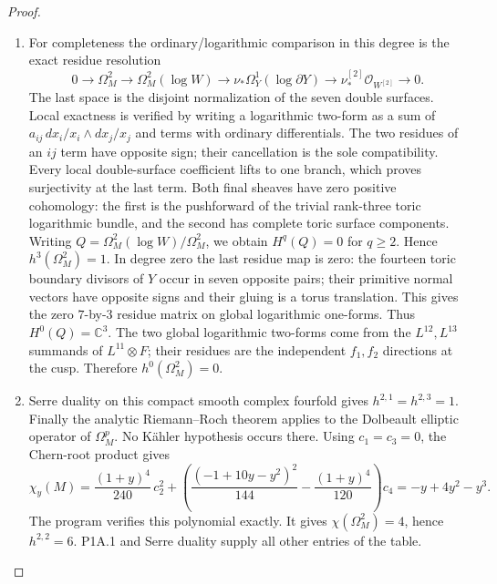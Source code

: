 \documentclass[11pt,a4paper]{article}
\theoremstyle{definition}
\begin{document}
\begin{proof}
\begin{enumerate}[label=\arabic*.]
\item For completeness the ordinary/logarithmic comparison in this
degree is the exact residue resolution
\[
0\to\Omega_M^2\to\Omega_M^2(\log W)
 \to\nu_*\Omega_Y^1(\log\partial Y)
 \to\nu^{[2]}_*\mathcal O_{W^{[2]}}\to0.
\]
The last space is the disjoint normalization of the seven
double surfaces. Local exactness is verified by writing a
logarithmic two-form as a sum of
$a_{ij}\,dx_i/x_i\wedge dx_j/x_j$ and terms with ordinary
differentials. The two residues of an $ij$ term have opposite
sign; their cancellation is the sole compatibility. Every local
double-surface coefficient lifts to one branch, which proves
surjectivity at the last term.
Both final sheaves have zero positive cohomology: the first
is the pushforward of the trivial rank-three toric logarithmic
bundle, and the second has complete toric surface components.
Writing $Q=\Omega_M^2(\log W)/\Omega_M^2$, we obtain
$H^q(Q)=0$ for $q\ge2$. Hence
$h^3(\Omega_M^2)=1$.
In degree zero the last residue map is zero: the fourteen toric
boundary divisors of $Y$ occur in seven opposite pairs; their
primitive normal vectors have opposite signs and their gluing
is a torus translation. This gives the zero $7$-by-$3$ residue
matrix on global logarithmic one-forms. Thus $H^0(Q)=\mathbb C^3$.
The two global logarithmic two-forms come from the
$L^{12},L^{13}$ summands of $L^{11}\otimes F$; their residues
are the independent $f_1,f_2$ directions at the cusp.
Therefore $h^0(\Omega_M^2)=0$.

\item Serre duality \cite[Theorem 4, p.~22]{Serre1955Duality} on this compact smooth complex fourfold gives
$h^{2,1}=h^{2,3}=1$. Finally the analytic Riemann--Roch theorem
\cite[Theorem 25.3.1, p.~187; \S25.4(a), pp.~188--190]{HirzebruchTopologicalMethods} applies to the Dolbeault elliptic
operator of $\Omega_M^p$. No Kähler hypothesis occurs there.
Using $c_1=c_3=0$, the Chern-root product gives
\[
\chi_y(M)=
\frac{(1+y)^4}{240}\,c_2^2+
\left(\frac{(-1+10y-y^2)^2}{144}
       -\frac{(1+y)^4}{120}\right)c_4
=-y+4y^2-y^3.
\]
The program verifies this polynomial exactly. It gives
$\chi(\Omega_M^2)=4$, hence $h^{2,2}=6$.
P1A.1 and Serre duality supply all other entries of the table.

\end{enumerate}
\end{proof}
\end{document}
